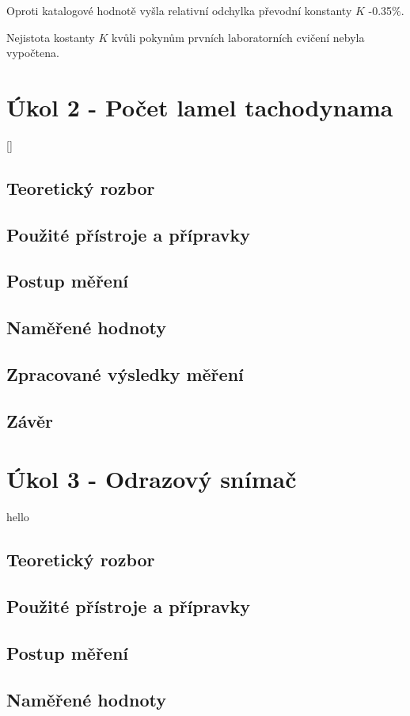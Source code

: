 \documentclass{protokol}
\begin{document}
        Oproti katalogové hodnotě vyšla relativní odchylka převodní konstanty $K$ -0.35$\%$. 

        Nejistota kostanty $K$ kvůli pokynům prvních laboratorních cvičení nebyla vypočtena.

\pagebreak

\section{Úkol 2 - Počet lamel tachodynama}
    []
    \subsection{Teoretický rozbor}
    \subsection{Použité přístroje a přípravky}
    \subsection{Postup měření}
    \subsection{Naměřené hodnoty}
    \subsection{Zpracované výsledky měření}
    \subsection{Závěr}

\pagebreak

\section{Úkol 3 - Odrazový snímač}
    hello
    \subsection{Teoretický rozbor}
    \subsection{Použité přístroje a přípravky}
    \subsection{Postup měření}
    \subsection{Naměřené hodnoty}
\end{document}

